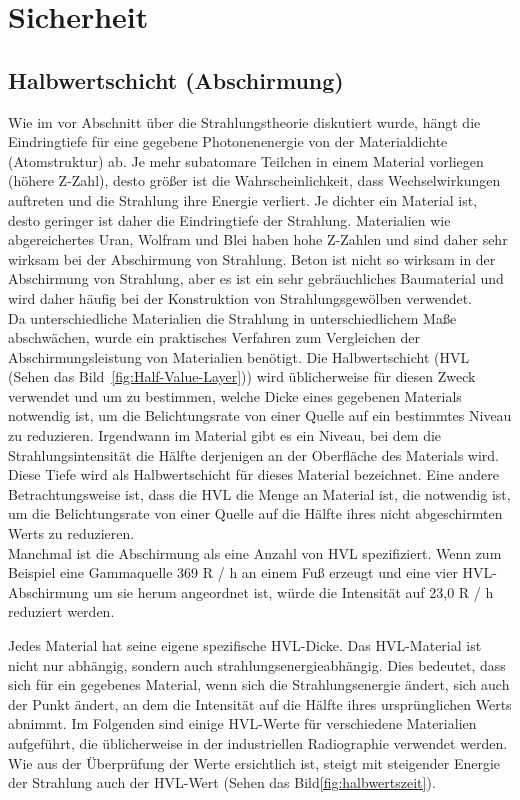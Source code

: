 \chapter{Sicherheit}
\label{chap:Sicherheit}

\section{Halbwertschicht (Abschirmung)}
\label{sec:Halbwertschicht }
Wie im vor Abschnitt über die Strahlungstheorie diskutiert wurde, hängt die Eindringtiefe für eine gegebene Photonenenergie von der Materialdichte (Atomstruktur) ab. Je mehr subatomare Teilchen in einem Material vorliegen (höhere Z-Zahl), desto größer ist die Wahrscheinlichkeit, dass Wechselwirkungen auftreten und die Strahlung ihre Energie verliert. Je dichter ein Material ist, desto geringer ist daher die Eindringtiefe der Strahlung. Materialien wie abgereichertes Uran, Wolfram und Blei haben hohe Z-Zahlen und sind daher sehr wirksam bei der Abschirmung von Strahlung. Beton ist nicht so wirksam in der Abschirmung von Strahlung, aber es ist ein sehr gebräuchliches Baumaterial und wird daher häufig bei der Konstruktion von Strahlungsgewölben verwendet.\\
Da unterschiedliche Materialien die Strahlung in unterschiedlichem Maße abschwächen, wurde ein praktisches Verfahren zum Vergleichen der Abschirmungsleistung von Materialien benötigt. Die Halbwertschicht (HVL (Sehen das Bild\ \ref{fig:Half-Value-Layer})) wird üblicherweise für diesen Zweck verwendet und um zu bestimmen, welche Dicke eines gegebenen Materials notwendig ist, um die Belichtungsrate von einer Quelle auf ein bestimmtes Niveau zu reduzieren. Irgendwann im Material gibt es ein Niveau, bei dem die Strahlungsintensität die Hälfte derjenigen an der Oberfläche des Materials wird. Diese Tiefe wird als Halbwertschicht für dieses Material bezeichnet. Eine andere Betrachtungsweise ist, dass die HVL die Menge an Material ist, die notwendig ist, um die Belichtungsrate von einer Quelle auf die Hälfte ihres nicht abgeschirmten Werts zu reduzieren.\\
Manchmal ist die Abschirmung als eine Anzahl von HVL spezifiziert. Wenn zum Beispiel eine Gammaquelle 369 R / h an einem Fuß erzeugt und eine vier HVL-Abschirmung um sie herum angeordnet ist, würde die Intensität auf 23,0 R / h reduziert werden.

Jedes Material hat seine eigene spezifische HVL-Dicke. Das HVL-Material ist nicht nur abhängig, sondern auch strahlungsenergieabhängig. Dies bedeutet, dass sich für ein gegebenes Material, wenn sich die Strahlungsenergie ändert, sich auch der Punkt ändert, an dem die Intensität auf die Hälfte ihres ursprünglichen Werts abnimmt. Im Folgenden sind einige HVL-Werte für verschiedene Materialien aufgeführt, die üblicherweise in der industriellen Radiographie verwendet werden. Wie aus der Überprüfung der Werte ersichtlich ist, steigt mit steigender Energie der Strahlung auch der HVL-Wert (Sehen das Bild\ref{fig:halbwertszeit}).

